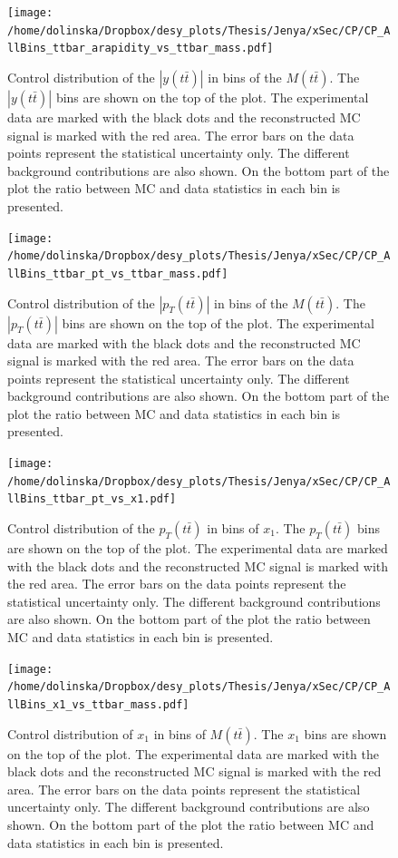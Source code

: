 \begin{figure}[p]
  \centering
  \texttt{[image: /home/dolinska/Dropbox/desy\_plots/Thesis/Jenya/xSec/CP/CP\_AllBins\_ttbar\_arapidity\_vs\_ttbar\_mass.pdf]}
  \caption{Control distribution of the $|y(t\bar{t})|$ in bins of the $M(t\bar{t})$. The $|y(t\bar{t})|$ bins are shown on the top 
  of the plot. The experimental data are marked with the black dots and the reconstructed MC signal is marked with the red area. The error
  bars on the data points represent the statistical uncertainty only. The 
  different background contributions are also shown. On the bottom part of the plot the ratio between MC and data statistics in each bin
  is presented.}
  \label{fig:CP_2D_ytt_Mtt}
\end{figure}

\begin{figure}[p]
  \centering
  \texttt{[image: /home/dolinska/Dropbox/desy\_plots/Thesis/Jenya/xSec/CP/CP\_AllBins\_ttbar\_pt\_vs\_ttbar\_mass.pdf]}
  \caption{Control distribution of the $|p_{T}(t\bar{t})|$ in bins of the $M(t\bar{t})$. The $|p_{T}(t\bar{t})|$ bins are shown on the top 
  of the plot. The experimental data are marked with the black dots and the reconstructed MC signal is marked with the red area. The error
  bars on the data points represent the statistical uncertainty only. The 
  different background contributions are also shown. On the bottom part of the plot the ratio between MC and data statistics in each bin
  is presented.}
  \label{fig:CP_2D_pttt_Mtt}
\end{figure}

\begin{figure}[p]
  \centering
  \texttt{[image: /home/dolinska/Dropbox/desy\_plots/Thesis/Jenya/xSec/CP/CP\_AllBins\_ttbar\_pt\_vs\_x1.pdf]}
  \caption{Control distribution of the $p_{T}(t\bar{t})$ in bins of $x_{1}$. The $p_{T}(t\bar{t})$ bins are shown on the top 
  of the plot. The experimental data are marked with the black dots and the reconstructed MC signal is marked with the red area. The error
  bars on the data points represent the statistical uncertainty only. The 
  different background contributions are also shown. On the bottom part of the plot the ratio between MC and data statistics in each bin
  is presented.}
  \label{fig:CP_2D_pttt_x1}
\end{figure}

\begin{figure}[p]
  \centering
  \texttt{[image: /home/dolinska/Dropbox/desy\_plots/Thesis/Jenya/xSec/CP/CP\_AllBins\_x1\_vs\_ttbar\_mass.pdf]}
  \caption{Control distribution of $x_{1}$ in bins of $M(t\bar{t})$. The $x_{1}$ bins are shown on the top 
  of the plot. The experimental data are marked with the black dots and the reconstructed MC signal is marked with the red area. The error
  bars on the data points represent the statistical uncertainty only. The 
  different background contributions are also shown. On the bottom part of the plot the ratio between MC and data statistics in each bin
  is presented.}
  \label{fig:CP_2D_Mtt_x1}
\end{figure}

